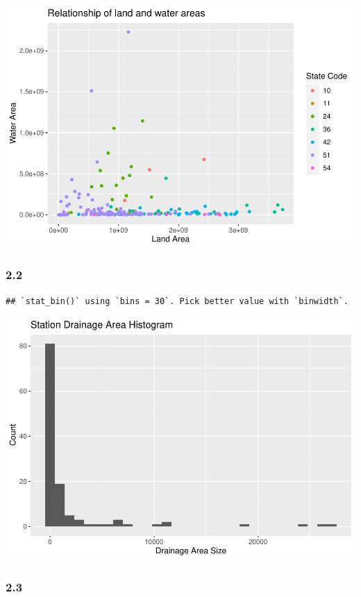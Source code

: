 \documentclass[
]{article}
\begin{document}
\includegraphics{Lab1_files/figure-latex/2.1-1.pdf}

\hypertarget{section-5}{%
\subsubsection{2.2}\label{section-5}}

\begin{verbatim}
## `stat_bin()` using `bins = 30`. Pick better value with `binwidth`.
\end{verbatim}

\includegraphics{Lab1_files/figure-latex/2.2-1.pdf}

\hypertarget{section-6}{%
\subsubsection{2.3}\label{section-6}}
\end{document}
